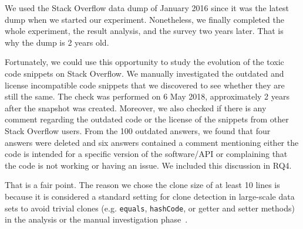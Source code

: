 \documentclass[a4paper,twoside,10pt]{reviewresponse}
\begin{document}

We used the Stack Overflow data dump of January 2016 since it was the latest dump when we started our experiment. Nonetheless, we finally completed the whole experiment, the result analysis, and the survey two years later. That is why the dump is 2 years old.

Fortunately, we could use this opportunity to study the evolution of the toxic code snippets on Stack Overflow. We manually investigated the outdated and license incompatible code snippets that we discovered to see whether they are still the same. The check was performed on 6 May 2018, approximately 2 years after the snapshot was created. Moreover, we also checked if there is any comment regarding the outdated code or the license of the snippets from other Stack Overflow users. From the 100 outdated answers, we found that four answers were deleted and six answers contained a comment mentioning either the code is intended for a specific version of the software/API or complaining that the code is not working or having an issue. 
We included this discussion in RQ4.


That is a fair point. The reason we chose the clone size of at least 10 lines is because it is considered a standard setting for clone detection in large-scale data sets to avoid trivial clones (e.g. \texttt{equals}, \texttt{hashCode}, or getter and setter methods) in the analysis or the manual investigation phase~\citep{Sajnani2016}. 
\end{document}
